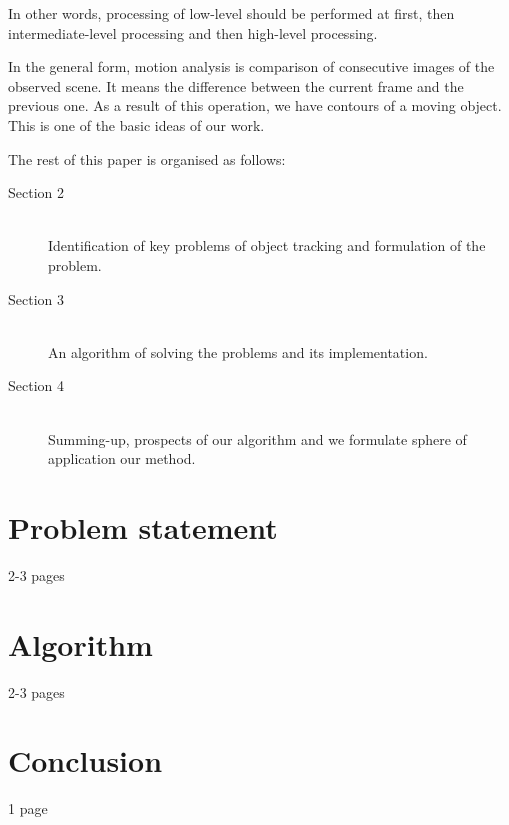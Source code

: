 \documentclass[12pt,a4paper,oneside,titlepage]{article}
\begin{document}
In other words, processing of low-level should be performed at first, then intermediate-level processing and then high-level processing.

In the general form, motion analysis is comparison of consecutive images of the observed scene.
It means the difference between the current frame and the previous one.
As a result of this operation, we have contours of a moving object.
This is one of the basic ideas of our work.

The rest of this paper is organised as follows:
\begin{description}
  \item[Section 2] \hfill \\
  Identification of key problems of object tracking and formulation of the problem.
  \item[Section 3] \hfill \\
  An algorithm of solving the problems and its implementation. 
  \item[Section 4] \hfill \\
  Summing-up, prospects of our algorithm and we formulate sphere of application our method.
\end{description}

\newpage
\section*{Problem statement}
2-3 pages



\newpage
\section*{Algorithm}
2-3 pages



\newpage
\section*{Conclusion}
1 page


\newpage
\renewcommand\refname{Bibliography}


\end{document}
